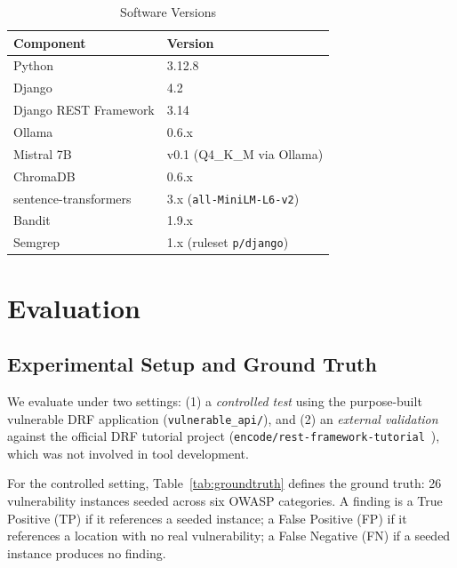 \documentclass[conference]{IEEEtran}
\begin{document}
\begin{table}[htbp]
\caption{Software Versions}
\label{tab:repro}
\centering
\small
\setlength{\tabcolsep}{4pt}
\begin{tabular}{@{}ll@{}}
\toprule
\textbf{Component} & \textbf{Version} \\
\midrule
Python             & 3.12.8 \\
Django             & 4.2 \\
Django REST Framework & 3.14 \\
Ollama             & 0.6.x \\
Mistral 7B         & v0.1 (Q4\_K\_M via Ollama) \\
ChromaDB           & 0.6.x \\
sentence-transformers & 3.x (\texttt{all-MiniLM-L6-v2}) \\
Bandit             & 1.9.x \\
Semgrep            & 1.x (ruleset \texttt{p/django}) \\
\bottomrule
\end{tabular}
\end{table}

\section{Evaluation}

\subsection{Experimental Setup and Ground Truth}

We evaluate under two settings: (1) a \textit{controlled test}
using the purpose-built vulnerable DRF application (\texttt{vulnerable\_api/}),
and (2) an \textit{external validation} against the official DRF tutorial project
(\texttt{encode/rest-framework-tutorial}~\cite{drftutorial}), which was not involved in
tool development.

For the controlled setting, Table~\ref{tab:groundtruth} defines the ground truth:
26 vulnerability instances seeded across six OWASP categories.
A finding is a True Positive (TP) if it references a seeded instance; a False
Positive (FP) if it references a location with no real vulnerability;
a False Negative (FN) if a seeded instance produces no finding.
\end{document}
